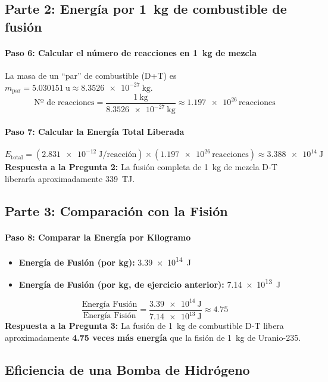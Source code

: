 \documentclass[11pt,a4paper]{book}
\begin{document}
\subsection*{Parte 2: Energía por \SI{1}{\kilo\gram} de combustible de fusión}

\paragraph{Paso 6: Calcular el número de reacciones en \SI{1}{\kilo\gram} de mezcla}
La masa de un ``par'' de combustible (D+T) es $m_{\text{par}} = \SI{5.030151}{\atomicmassunit} \approx \SI{8.3526e-27}{\kilo\gram}$.
\[ \text{Nº de reacciones} = \frac{\SI{1}{\kilo\gram}}{\SI{8.3526e-27}{\kilo\gram}} \approx \num{1.197e26} \, \text{reacciones} \]

\paragraph{Paso 7: Calcular la Energía Total Liberada}
\[ E_{\text{total}} = (\SI{2.831e-12}{\joule\per\text{reacción}}) \times (\num{1.197e26} \, \text{reacciones}) \approx \SI{3.388e14}{\joule} \]
\textbf{Respuesta a la Pregunta 2:} La fusión completa de \SI{1}{\kilo\gram} de mezcla D-T liberaría aproximadamente \SI{339}{\tera\joule}.

\subsection*{Parte 3: Comparación con la Fisión}

\paragraph{Paso 8: Comparar la Energía por Kilogramo}
\begin{itemize}
    \item \textbf{Energía de Fusión (por kg):} \SI{3.39e14}{\joule}
    \item \textbf{Energía de Fusión (por kg, de ejercicio anterior):} \SI{7.14e13}{\joule}
\end{itemize}
\[ \frac{\text{Energía Fusión}}{\text{Energía Fisión}} = \frac{\SI{3.39e14}{\joule}}{\SI{7.14e13}{\joule}} \approx 4.75 \]
\textbf{Respuesta a la Pregunta 3:} La fusión de \SI{1}{\kilo\gram} de combustible D-T libera aproximadamente \textbf{4.75 veces más energía} que la fisión de \SI{1}{\kilo\gram} de Uranio-235.

\subsection*{Eficiencia de una Bomba de Hidrógeno}
\end{document}
